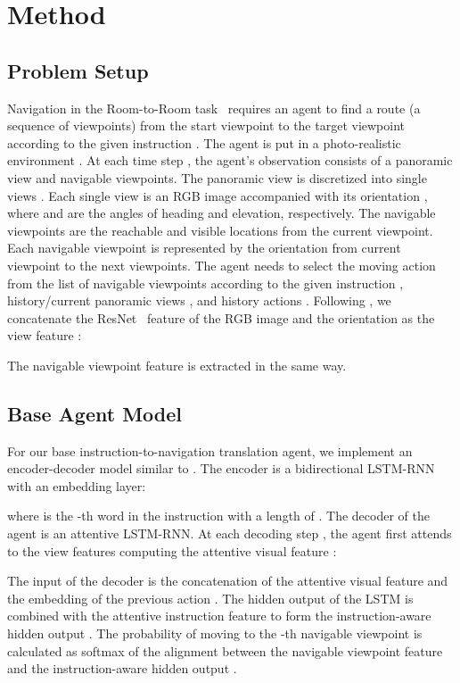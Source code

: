 \documentclass[11pt,a4paper]{article}
\begin{document}
\section{Method}
\label{sec:method}

\subsection{Problem Setup}
\label{sec:problem_setup}
Navigation in the Room-to-Room task~\cite{mattersim} requires an agent to find a route  (a sequence of viewpoints) from the start viewpoint  to the target viewpoint  according to the given instruction .
The agent is put in a photo-realistic environment . 
At each time step , the agent's observation consists of a panoramic view and navigable viewpoints.
The panoramic view  is discretized into  single views .
Each single view  is an RGB image  accompanied with its orientation , where  and  are the angles of heading and elevation, respectively.
The navigable viewpoints  are the  reachable and visible locations from the current viewpoint.
Each navigable viewpoint  is represented by the orientation  from current viewpoint to the next viewpoints.
The agent needs to select the moving action  from the list of navigable viewpoints  according to the given instruction , history/current panoramic views , and history actions . 
Following , we concatenate the ResNet~\cite{he2016deep} feature of the RGB image and the orientation as the view feature :

The navigable viewpoint feature  is extracted in the same way.

\subsection{Base Agent Model}
\label{sec:model} 
For our base instruction-to-navigation translation agent, we implement an encoder-decoder model similar to . 
The encoder is a bidirectional LSTM-RNN with an embedding layer:
\vspace{-5pt}
 
where  is the -th word in the instruction with a length of .
The decoder of the agent is an attentive LSTM-RNN. 
At each decoding step , the agent first attends to the view features  computing the attentive visual feature :
\vspace{-5pt}

The input of the decoder is the concatenation of the attentive visual feature  and the embedding of the previous action . 
The hidden output  of the LSTM is combined with the attentive instruction feature  to form the instruction-aware hidden output . 
The probability of moving to the -th navigable viewpoint  is calculated as softmax of the alignment between the navigable viewpoint feature  and the instruction-aware hidden output .
\end{document}
